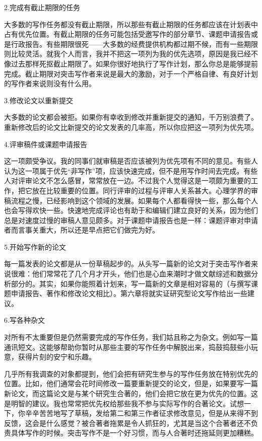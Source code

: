 {\kaishu 2.完成有截止期限的任务}

大多数的写作任务都没有截止期限，所以那些有截止期限的任务都应该在计划表中占有优先位置。有截止期限的任务可能包括受邀写作的部分章节、课题申请报告或是行政报告。有些期限很死——大多数的经费提供机构都过期不候，而有一些期限则比较灵活。就我个人而言，我并不把这一项列为我的优先选项，原因是我已经不像过去那样死抠截止期限了。如果你很好地执行了写作计划，那么你总是能够提前完成。截止期限对突击写作者来说是最大的激励，对于一个严格自律、有良好计划的写作者来说则没有什么用。

{\kaishu 3.修改论文以重新提交}

大多数的论文都会被拒。如果你有幸收到修改并重新提交的通知，千万别浪费了。重新修改后的论文比新提交的论文发表的几率高，所以你应把这一项列为优先项。

{\kaishu 4.评审稿件或课题申请报告}

这一项颇受争议。我的同事们就审稿是否应该被列为优先项有不同的意见。有些人认为这一项属于优先“非写作”项，应该快速完成，但不是用写作时间去完成。有些人对评审论文不怎么感冒，常常放在一边。不过我个人觉得这是一项颇为重要的工作，把它放在比较重要的位置。同行评审的过程与评审人关系甚大。心理学界的审稿流程之慢，已经影响到这个领域的发展。如果每个人都看得快一些，那么每个人也会写得欢快一些。快速地完成评论也有助于和编辑们建立良好的关系，因为他们总是对速度过慢的审稿人意见颇多。对于课题申请报告也是一样：课题评审对申请者而言事关重大，所以还是早点把它们做完为好。

{\kaishu 5.开始写作新的论文}

每一篇发表的论文都是从一份草稿起步的。从头写一篇新的论文对于突击写作者来说很难：他们常常花了几个月才开头，他们也是心血来潮时才做文献综述和数据分析部分的。其实，如果你能照着计划来，写一篇新的文章是相对容易的（与撰写课题申请报告、著作和修改论文相比）。第六章将就实证研究型论文写作给出一些建议。

{\kaishu 6.写各种杂文}

对所有不太重要但是仍然需要完成的写作任务，我们姑且称之为杂文。例如写一篇通讯短文。这能够帮助你暂时从那些主要的写作任务中解脱出来，捣鼓捣鼓些小玩意，获得片刻的安宁和乐趣。

几乎所有我调查的对象都提到，他们会把有研究生参与的写作任务放在特别优先的位置。比如，他们通常会花时间修改一篇要重新提交的论文，但是，如果要写一篇新论文，而这篇论文是与某个研究生合著的，他们会把它放在更为优先的位置。这是明智的建议。我也常常把优先权给那些我不参与实际写作的合著论文。试想一下，你辛辛苦苦地写了草稿，发给第二和第三作者征求修改意见，但是从来得不到反馈，这会是什么感觉？被合著者拖累是令人抓狂的，尤其是当这个合著者还不负责具体写作的时候。突击写作不是一个好习惯，而与人合著时还拖延则更加糟糕。

